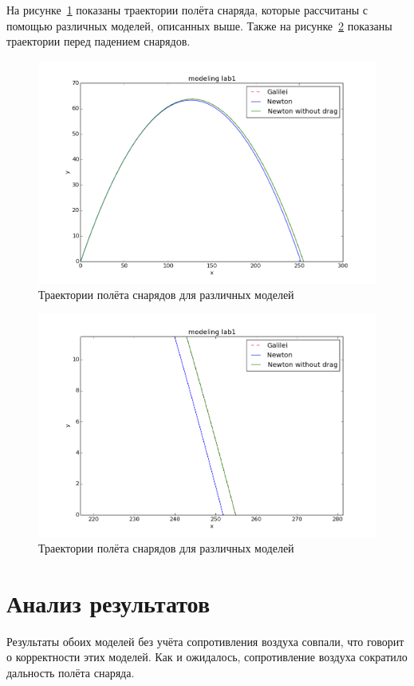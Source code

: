 \documentclass[12pt,a4paper,oneside]{extarticle}
\begin{document}
    На рисунке~\ref{pic:figure} показаны траектории полёта снаряда, которые рассчитаны с помощью различных моделей, описанных выше. Также на рисунке~\ref{pic:figure_zoom} показаны траектории перед падением снарядов.
    \begin{figure}[h!]
        \centering
        \includegraphics[scale=0.65]{figure_1.png}
        \caption{Траектории полёта снарядов для различных моделей}
        \label{pic:figure}
    \end{figure}

    \begin{figure}[h!]
        \centering
        \includegraphics[scale=0.65]{figure_1_zoom.png}
        \caption{Траектории полёта снарядов для различных моделей}
        \label{pic:figure_zoom}
    \end{figure}

\section{Анализ результатов}
    Результаты обоих моделей без учёта сопротивления воздуха совпали, что говорит о корректности этих моделей. Как и ожидалось, сопротивление воздуха сократило дальность полёта снаряда.
\end{document}
